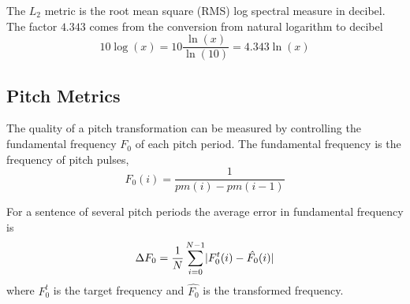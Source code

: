 \begin{remark}
	The $L_2$ metric is the root mean square (RMS) log spectral measure in decibel. The factor $4.343$ comes from the conversion from natural logarithm to decibel
	\begin{equation}
		10\log(x) = 10 \frac{\ln(x)}{\ln(10)} = 4.343\ln(x) 
	\end{equation}	
\end{remark}


\subsection{Pitch Metrics} %
\label{sub:pitch_metrics}
The quality of a pitch transformation can be measured by controlling the fundamental frequency $F_0$ of each pitch period. The fundamental frequency is the frequency of pitch pulses, \ie 
\begin{equation}
	F_0(i) = \frac{1}{pm(i)-pm(i-1)}
\end{equation}

For a sentence of several pitch periods the average error in fundamental frequency is
\begin{equation}
	\Delta F_0 = \frac{1}{N}\sum_{i=0}^{N-1} \lvert F_0^t(i) - \hat{F_0}(i)\rvert
\end{equation}
where $F_0^t$ is the target frequency and $\hat{F_0}$ is the transformed frequency.




